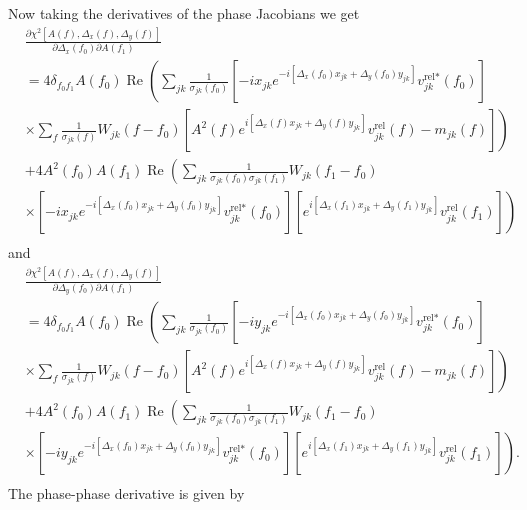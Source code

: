 \documentclass{article}
\newcommand\re{\operatorname{Re}}
\begin{document}
Now taking the derivatives of the phase Jacobians we get
\begin{equation}
\begin{split}
    &\frac{\partial \chi^2[A(f), \Delta_x(f), \Delta_y(f)]}{\partial \Delta_x(f_0) \partial A(f_1)} \\
    & = 4 \delta_{f_0 f_1} A(f_0) \re \left( \sum_{jk} \frac{1}{\sigma_{jk}(f_0)} \left[ -i x_{jk} e^{-i[\Delta_x(f_0) x_{jk} + \Delta_y(f_0) y_{jk}]} v^{\text{rel}*}_{jk}(f_0) \right] \right. \\
    & \left. \times \sum_{f} \frac{1}{\sigma_{jk}(f)} W_{jk}(f-f_0) \left[ A^2(f) e^{i[\Delta_x(f) x_{jk} + \Delta_y(f) y_{jk}]} v^\text{rel}_{jk}(f) - m_{jk}(f) \right] \right) \\
    &+ 4 A^2(f_0) A(f_1) \re \left( \sum_{jk} \frac{1}{\sigma_{jk}(f_0) \sigma_{jk}(f_1)} W_{jk}(f_1-f_0) \right. \\
    & \left. \times \left[ -i x_{jk} e^{-i[\Delta_x(f_0) x_{jk} + \Delta_y(f_0) y_{jk}]} v^{\text{rel}*}_{jk}(f_0) \right] \left[e^{i[\Delta_x(f_1) x_{jk} + \Delta_y(f_1) y_{jk}]} v^\text{rel}_{jk}(f_1)\right] \right) \\
\end{split}
\end{equation}
and
\begin{equation}
\begin{split}
    &\frac{\partial \chi^2[A(f), \Delta_x(f), \Delta_y(f)]}{\partial \Delta_y(f_0) \partial A(f_1)} \\
    & = 4 \delta_{f_0 f_1} A(f_0) \re \left( \sum_{jk} \frac{1}{\sigma_{jk}(f_0)} \left[ -i y_{jk} e^{-i[\Delta_x(f_0) x_{jk} + \Delta_y(f_0) y_{jk}]} v^{\text{rel}*}_{jk}(f_0) \right] \right. \\
    & \left. \times \sum_{f} \frac{1}{\sigma_{jk}(f)} W_{jk}(f-f_0) \left[ A^2(f) e^{i[\Delta_x(f) x_{jk} + \Delta_y(f) y_{jk}]} v^\text{rel}_{jk}(f) - m_{jk}(f) \right] \right) \\
    &+ 4 A^2(f_0) A(f_1) \re \left( \sum_{jk} \frac{1}{\sigma_{jk}(f_0) \sigma_{jk}(f_1)} W_{jk}(f_1-f_0) \right. \\
    & \left. \times \left[ -i y_{jk} e^{-i[\Delta_x(f_0) x_{jk} + \Delta_y(f_0) y_{jk}]} v^{\text{rel}*}_{jk}(f_0) \right] \left[e^{i[\Delta_x(f_1) x_{jk} + \Delta_y(f_1) y_{jk}]} v^\text{rel}_{jk}(f_1)\right] \right). \\
\end{split}
\end{equation}
The phase-phase derivative is given by
\end{document}
